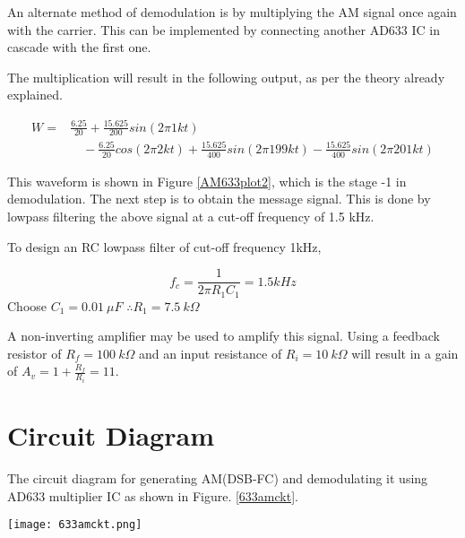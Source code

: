 An alternate method of demodulation is by multiplying the AM signal once again with the carrier. This can be implemented by connecting another AD633 IC in cascade with the first one.

\noindent The multiplication will result in the following output, as per the theory already explained.

\begin{equation}
\begin{split}
W=& \frac{6.25}{20} +\frac{15.625}{200}sin(2\pi 1kt)\\
&\quad  -\frac{6.25}{20}cos(2\pi 2kt) +\frac{15.625}{400}sin(2\pi199kt) -\frac{15.625}{400}sin(2\pi 201kt)
\end{split}
\end{equation}

\noindent This waveform is shown in Figure \ref{AM633plot2}, which is the stage -1 in demodulation. The next step is to obtain the message signal. This is done by lowpass filtering the above signal at a cut-off frequency of 1.5 kHz.

To design an RC lowpass filter of cut-off frequency 1kHz,

\begin{equation}
f_c=\frac{1}{2\pi R_1C_1}=1.5kHz
\end{equation}
Choose $C_1=0.01\  \mu F$
$\therefore  R_1 =7.5 \ k \Omega$

A non-inverting amplifier may be used to amplify this signal. Using a feedback resistor of $R_f= 100 \ k \Omega$ and an input resistance of $R_i=10\ k\Omega$ will result in a gain of $A_v=1+\frac{R_f}{R_i}=11$.
\section*{Circuit Diagram}
The circuit diagram for generating AM(DSB-FC) and demodulating it using AD633 multiplier IC as shown in Figure. \ref{633amckt}. 

\begin{sidewaysfigure}[ht]
    \texttt{[image: 633amckt.png]}
    \caption{Circuit for AM generation and detection using AD633 multiplier IC}
    \label{633amckt}
\end{sidewaysfigure}


